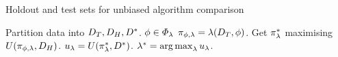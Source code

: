 \begin{frame}
\begin{block}{Holdout and test sets for unbiased algorithm comparison}
    \begin{algorithm}[H]
      \begin{algorithmic}
        \State Partition data into $D_T, D_H, D^*$.
        \For {$\alg \in \Alg$} \For
        {$\phi \in \Phi_\lambda$} \State
        $\pi_{\phi, \lambda} = \lambda(D_T, \phi)$.
        \EndFor
        \State Get $\pi^*_{\lambda}$ maximising
        $U(\pi_{\phi, \lambda}, D_H)$.  \State
        $u_\lambda = U(\pi^*_\lambda, D^*)$.
        \EndFor
        \State $\lambda^* = \mathop{\rm arg\,max}_\lambda u_\lambda$.
      \end{algorithmic}
      \caption{Unbiased adaptive evaluation through data partitioning}
    \end{algorithm}
  \end{block}
\end{frame}

